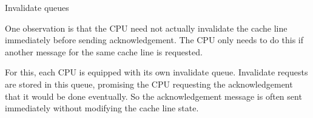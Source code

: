\documentclass[notes, xcolor = dvipsnames]{beamer}
\begin{document}
    \begin{frame}{Invalidate queues}
        
        One observation is that the CPU need not actually invalidate the cache line immediately before sending acknowledgement.
        The CPU only needs to do this if another message for the same cache line is requested. 

        For this, each CPU is equipped with its own invalidate queue. 
        Invalidate requests are stored in this queue, promising the CPU requesting the acknowledgement that it would be done eventually. 
        So the acknowledgement message is often sent immediately without modifying the cache line state. 

        \begin{figure}
        \end{figure}

    \end{frame}
\end{document}
